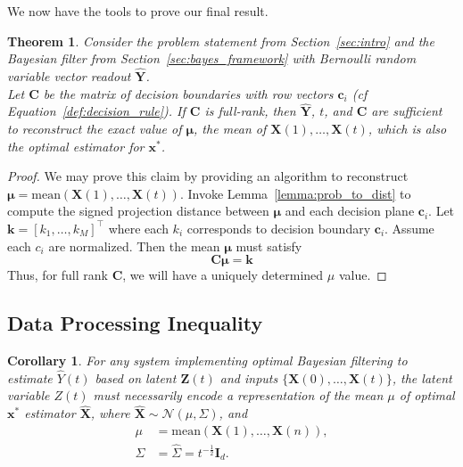 \documentclass[12pt]{article}
\newtheorem{theorem}{Theorem}
\newtheorem{corollary}{Corollary}
\begin{document}
We now have the tools to prove our final result. 

\begin{theorem}
	\label{thm:main}
	Consider the problem statement from Section~\ref{sec:intro} and the Bayesian filter from Section~\ref{sec:bayes_framework} with Bernoulli random variable vector readout $\hat{\mathbf Y}$. \\
	
	Let $\mathbf C$ be the matrix of decision boundaries with row vectors $\mathbf c_i$ (cf Equation~\ref{def:decision_rule}). 
	If $\mathbf C$ is full-rank, then $\hat{\mathbf Y}$, $t$, and $\mathbf C$ are sufficient to reconstruct the exact value of $\mathbf \mu$, the mean of $\mathbf X(1), \dots, \mathbf X(t)$, which is also the optimal estimator for $\mathbf x^*$. 
\end{theorem}
\begin{proof}
	We may prove this claim by providing an algorithm to reconstruct $\mathbf \mu = \text{mean}(\mathbf X(1), \dots, \mathbf X(t))$.
	Invoke Lemma~\ref{lemma:prob_to_dist} to compute the signed projection distance between $\mathbf \mu$ and each decision plane $\mathbf c_i$.
	Let $\mathbf k = [k_1, \dots, k_M]^\top$ where each $k_i$ corresponds to decision boundary $\mathbf c_i$.
	Assume each $c_i$ are normalized. Then the mean $\mathbf \mu$ must satisfy 
	\begin{equation}
		\label{eqn:final_lin_sys}
		\mathbf {C \mu} = \mathbf k
	\end{equation}
	Thus, for full rank $\mathbf C$, we will have a uniquely determined $\mu$ value. 
\end{proof}


\subsection{Data Processing Inequality}


\begin{corollary}
	For any system implementing optimal Bayesian filtering to estimate $\hat Y(t)$ based on latent $\mathbf Z(t)$ and inputs $\{\mathbf X(0), \dots, \mathbf X(t)\}$, the latent variable $Z(t)$ must necessarily encode a representation of the mean $\mu$ of optimal $\mathbf x^*$ estimator $\hat{\mathbf X}$, where $\hat{\mathbf X} \sim \mathcal{N}(\mu, \Sigma)$, and
	\begin{align*}
		\mu &= \text{mean}\left(\mathbf X(1), \dots, \mathbf X(n)\right), \\
		\Sigma &= \hat{\Sigma} = t^{-\frac{1}{2}} \mathbf{I}_d.
	\end{align*}
\end{corollary}
\end{document}
